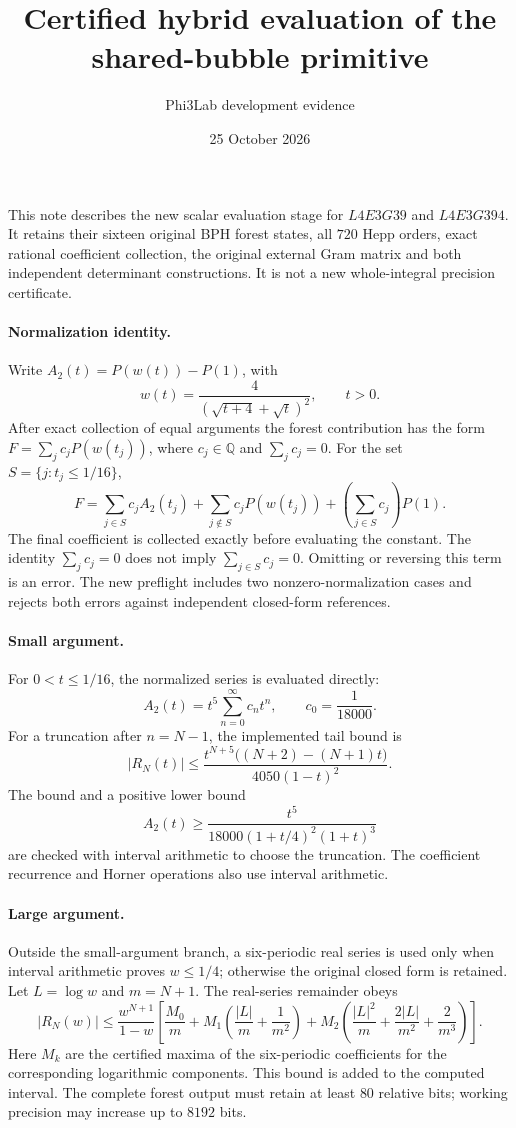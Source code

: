 \documentclass[11pt]{article}
\title{Certified hybrid evaluation of the shared-bubble primitive}
\author{Phi3Lab development evidence}
\date{25 October 2026}
\begin{document}
\maketitle
\noindent This note describes the new scalar evaluation stage for
$L4E3G39$ and $L4E3G394$. It retains their sixteen original BPH forest
states, all $720$ Hepp orders, exact rational coefficient collection,
the original external Gram matrix and both independent determinant constructions.
It is not a new whole-integral precision certificate.

\paragraph{Normalization identity.}
Write $A_2(t)=P(w(t))-P(1)$, with
\[
 w(t)=\frac{4}{(\sqrt{t+4}+\sqrt t)^2}, \qquad t>0 .
\]
After exact collection of equal arguments the forest contribution has the
form $F=\sum_j c_j P(w(t_j))$, where $c_j\in\mathbb Q$ and
$\sum_j c_j=0$. For the set $S=\{j:t_j\leq1/16\}$,
\[
 F=\sum_{j\in S}c_j A_2(t_j)
   +\sum_{j\notin S}c_jP(w(t_j))
   +\left(\sum_{j\in S}c_j\right)P(1).
\]
The final coefficient is collected exactly before evaluating the constant.
The identity $\sum_jc_j=0$ does not imply
$\sum_{j\in S}c_j=0$. Omitting or reversing this term is an error.
The new preflight includes two nonzero-normalization cases and
rejects both errors against independent closed-form references.

\paragraph{Small argument.}
For $0<t\leq1/16$, the normalized series is evaluated directly:
\[
 A_2(t)=t^5\sum_{n=0}^{\infty}c_n t^n,\qquad c_0=\frac1{18000}.
\]
For a truncation after $n=N-1$, the implemented tail bound is
\[
 |R_N(t)|\leq
 \frac{t^{N+5}\big((N+2)-(N+1)t\big)}{4050(1-t)^2}.
\]
The bound and a positive lower bound
\[
 A_2(t)\geq
 \frac{t^5}{18000(1+t/4)^2(1+t)^3}
\]
are checked with interval arithmetic to choose the truncation.
The coefficient recurrence and Horner operations also use interval arithmetic.

\paragraph{Large argument.}
Outside the small-argument branch, a six-periodic real series is used
only when interval arithmetic proves $w\leq1/4$; otherwise the original
closed form is retained. Let $L=\log w$ and $m=N+1$. The real-series
remainder obeys
\[
 |R_N(w)|\leq\frac{w^{N+1}}{1-w}
 \left[
 \frac{M_0}{m}
 +M_1\left(\frac{|L|}{m}+\frac1{m^2}\right)
 +M_2\left(\frac{|L|^2}{m}+\frac{2|L|}{m^2}+\frac2{m^3}\right)
 \right].
\]
Here $M_k$ are the certified maxima of the six-periodic coefficients
for the corresponding logarithmic components.
This bound is added to the computed interval.
The complete forest output must retain at least $80$ relative bits;
working precision may increase up to $8192$ bits.
\end{document}
